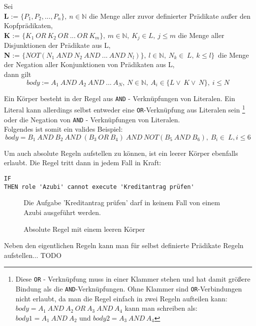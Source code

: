 Sei\\
\textbf{L} := $\{P_1,P_2,...,P_n\},\ n\in\mathbb{N}$ die Menge aller zuvor definierter Prädikate außer den Kopfprädikaten,\\
\textbf{K} := $\{K_1\ OR\ K_2\ OR\ ...\ OR\ K_m\},\ m \in \mathbb{N},\ K_j \in L,\ j \leq m$ die Menge aller Disjunktionen der Prädikate aus L,\\
\textbf{N} := $\{NOT(N_1\ AND\ N_2\ AND\ ...\ AND\ N_l)\},\ l \in \mathbb{N},\ N_k\in\ L,\ k \leq l\}$\ die Menge der Negation aller Konjunktionen von Prädikaten aus L,\\
dann gilt $$body := A_1\ AND\ A_2\ AND\ ...\ A_N,\ N\in\mathbb{N},\ A_i\in \{L\vee\ K\vee\ N\},\ i \leq N$$


Ein Körper besteht in der Regel aus \texttt{AND} - Verknüpfungen von Literalen. Ein Literal kann allerdings selbst entweder eine \texttt{OR}-Verknüpfung aus Literalen sein \footnote{Diese \texttt{OR} - Verknüpfung muss in einer Klammer stehen und hat damit größere Bindung als die \texttt{AND}-Verknüpfungen. Ohne Klammer sind \texttt{OR}-Verbindungen nicht erlaubt, da man die Regel einfach in zwei Regeln aufteilen kann: $body=A_1\ AND\ A_2\ OR\ A_3\ AND\ A_4$ kann man schreiben als: $body1 =A_1\ AND\ A_2 $ und $body2=A_3\ AND\ A_4$} oder die Negation von \texttt{AND} - Verknüpfungen von Literalen.\\ 
Folgendes ist somit ein valides Beispiel:
$$body=B_1\ AND\ B_2\ AND\ (B_3\ OR\ B_4)\ AND\ NOT(B_5\ AND\ B_6),\ B_i\in\ L, i \leq 6$$

Um auch absolute Regeln aufstellen zu können, ist ein leerer Körper ebenfalls erlaubt. Die Regel tritt dann in jedem Fall in Kraft:

\begin{verbatim}
IF 
THEN role 'Azubi' cannot execute 'Kreditantrag prüfen'
\end{verbatim}
\begin{figure}[!h]
\small Die Aufgabe 'Kreditantrag prüfen' darf in keinem Fall von einem Azubi ausgeführt werden.
\caption{Absolute Regel mit einem leeren Körper}
\label{fig:absolute}
\end{figure}

Neben den eigentlichen Regeln kann man für selbst definierte Prädikate Regeln aufstellen... TODO

